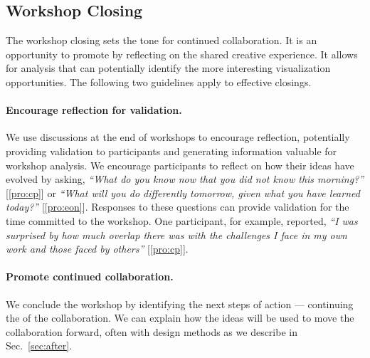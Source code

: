 \subsection{Workshop Closing}

The workshop closing sets the tone for continued collaboration. It is an opportunity to promote \collegiality by reflecting on the shared creative experience. It allows for analysis that can potentially identify the more interesting visualization opportunities. The following two guidelines apply to effective closings. %

\paragraph{Encourage reflection for validation.} We use discussions at the end of workshops to encourage reflection, potentially providing validation to participants and generating information valuable for workshop analysis. We encourage participants to reflect on how their ideas have evolved by asking, \emph{``What do you know now that you did not know this morning?''} [\ref{pro:cp}] or \emph{``What will you do differently tomorrow, given what you have learned today?''} [\ref{pro:eon}]. Responses to these questions can provide validation for the time committed to the workshop. One participant, for example, reported, \emph{``I was surprised by how much overlap there was with the challenges I face in my own work and those faced by others''} [\ref{pro:cp}]. 


\paragraph{Promote continued collaboration.} We conclude the workshop by identifying the next steps of action --- continuing the \methodology of the collaboration. We can explain how the ideas will be used to move the collaboration forward, often with design methods as we describe in Sec.~\ref{sec:after}. 

